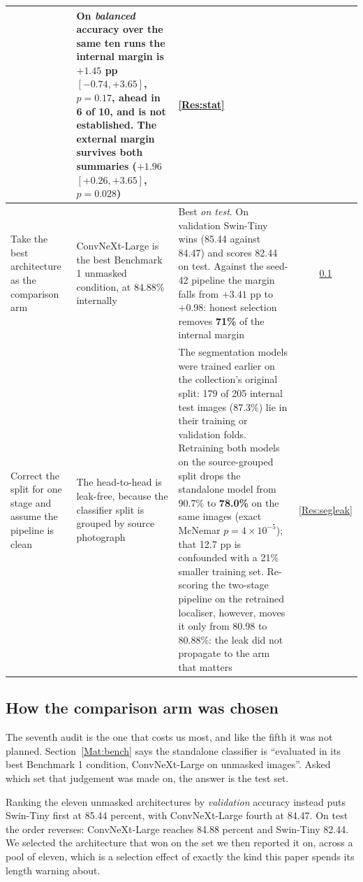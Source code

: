 \documentclass{melba}
\begin{document}
\begin{table}[t]
\begin{tabular}{|p{}|p{}|p{}|c|}
& On \emph{balanced} accuracy over the same ten runs the internal margin is $+1.45$ pp $[-0.74,+3.65]$, $p=0.17$, ahead in 6 of 10, and is not established. The external margin survives both summaries ($+1.96$ $[+0.26,+3.65]$, $p=0.028$)
& \ref{Res:stat} \\
\hline
Take the best architecture as the comparison arm
& ConvNeXt-Large is the best Benchmark 1 unmasked condition, at 84.88\% internally
& Best \emph{on test}. On validation Swin-Tiny wins (85.44 against 84.47) and scores 82.44 on test. Against the seed-42 pipeline the margin falls from $+3.41$ pp to $+0.98$: honest selection removes \textbf{71\%} of the internal margin
& \ref{Res:selection} \\
\hline
Correct the split for one stage and assume the pipeline is clean
& The head-to-head is leak-free, because the classifier split is grouped by source photograph
& The segmentation models were trained earlier on the collection's original split: 179 of 205 internal test images (87.3\%) lie in their training or validation folds. Retraining both models on the source-grouped split drops the standalone model from 90.7\% to \textbf{78.0\%} on the same images (exact McNemar $p=4\times10^{-5}$); that 12.7 pp is confounded with a 21\% smaller training set. Re-scoring the two-stage pipeline on the retrained localiser, however, moves it only from 80.98 to 80.88\%: the leak did not propagate to the arm that matters
& \ref{Res:segleak} \\
\hline
\end{tabular}
\label{tab:audit}
\end{table}


\subsection{How the comparison arm was chosen}
\label{Res:selection}
The seventh audit is the one that costs us most, and like the fifth it was not planned. Section~\ref{Mat:bench} says the standalone classifier is ``evaluated in its best Benchmark 1 condition, ConvNeXt-Large on unmasked images''. Asked which set that judgement was made on, the answer is the test set.

Ranking the eleven unmasked architectures by \emph{validation} accuracy instead puts Swin-Tiny first at 85.44 percent, with ConvNeXt-Large fourth at 84.47. On test the order reverses: ConvNeXt-Large reaches 84.88 percent and Swin-Tiny 82.44. We selected the architecture that won on the set we then reported it on, across a pool of eleven, which is a selection effect of exactly the kind this paper spends its length warning about.
\end{document}

